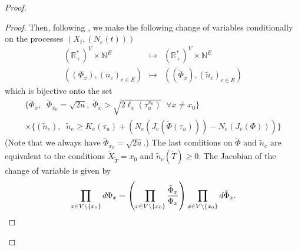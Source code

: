 \documentclass[11pt,a4paper]{amsart}
\numberwithin{equation}{section}
\def\R{{\mathbb R}}
\def\N{{\mathbb N}}
\begin{document}
\begin{proof}
\begin{proof}
Then, following \cite{SabotTarres2015RK},  we make the following change of variables conditionally on the processes $(X_t, (N_e(t)))$
\begin{eqnarray*}
(\R_+^*)^V\times \N^E&\mapsto& (\R_+^*)^V\times \N^E\\
((\Phi_x), (n_e)_{e\in E})&\mapsto&
((\tilde \Phi_x), (\tilde n_e)_{e\in E})
\end{eqnarray*}
which is bijective onto the set 
\begin{multline*}
\{\tilde\Phi_x, \;\; \tilde\Phi_{x_0}=\sqrt{2u}, \; \check\Phi_x>\sqrt{2\ell_x(\tau_u^{x_0})}\;\;\forall x\neq x_0\} 
\\\times \{(\tilde n_e),\;\; \tilde n_e\ge K_e(\tau_u)+(N_e(J_e(\tilde \Phi(\tau_u)))-N_e(J_e(\Phi)))\}
\end{multline*}
(Note that we always have $\tilde \Phi_{x_0}=\sqrt{2u}$.) The last conditions on $\tilde \Phi$ and $\tilde n_e$ are equivalent to
the conditions $\tilde X_{\tilde T}=x_0$ and $\tilde n_e(\tilde T)\ge 0$.
The Jacobian of the change of variable is given by
$$
\prod_{x\in V\setminus\{x_0\}} d\Phi_x=\left({\prod_{x\in V\setminus\{x_0\}} {\check\Phi_x\over \Phi_x} }\right)\prod_{x\in V\setminus\{x_0\}} d\check\Phi_x.
$$


\end{proof}


\end{proof}
\end{document}
